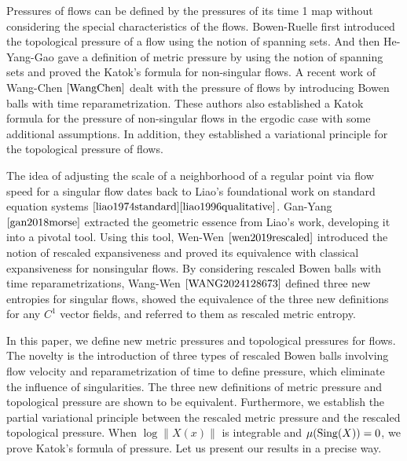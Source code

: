 \documentclass[10pt]{article}
\newtheorem*{Theorem A}{Theorem A}
\begin{document}
Pressures of flows can be defined by the pressures of its time 1 map without considering the special characteristics of the flows. Bowen-Ruelle \cite{Bowen1975} first introduced the topological pressure of a flow using the notion of spanning sets. And then He-Yang-Gao \cite{he2004metrical} gave a definition of metric pressure by using the notion of spanning sets and proved the Katok's formula for non-singular flows. A recent work of Wang-Chen \(\cite{WangChen}\) dealt with the pressure of flows by introducing Bowen balls with time reparametrization. These authors also established a Katok formula for the pressure of non-singular flows in the ergodic case with some additional assumptions. In addition, they established a variational principle for the topological pressure of flows.

The idea of adjusting the scale of a neighborhood of a regular point via flow speed for a singular flow dates back to Liao's foundational work on standard equation systems \(\cite{liao1974standard}\cite{liao1996qualitative}\).  Gan-Yang \(\cite{gan2018morse}\) extracted the geometric essence from Liao's work, developing it into a pivotal tool. Using this tool, Wen-Wen \(\cite{wen2019rescaled}\) introduced the notion of rescaled expansiveness and proved its equivalence with classical expansiveness for nonsingular flows.
By considering rescaled
Bowen balls with time reparametrizations, Wang-Wen \(\cite{WANG2024128673}\)  defined three new entropies for singular flows, showed the equivalence of the three new definitions for any
\(C^1\) vector  fields, and referred to them as rescaled metric entropy.

In this paper, we define new metric pressures and topological pressures for flows. The novelty is the introduction of three types of rescaled Bowen balls involving flow velocity and reparametrization of time to define pressure, which eliminate the influence of singularities. The
three new definitions of metric pressure and topological pressure are shown to be equivalent.   Furthermore, we establish the partial variational principle between the rescaled metric pressure and the rescaled topological pressure. When \( \log\|X(x)\| \) is integrable and \(\mu({\rm Sing}(X))=0\), we prove Katok's formula of pressure.
Let us present our results in a precise way.
\end{document}
